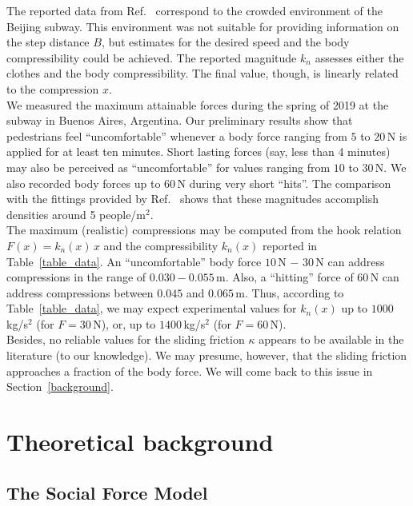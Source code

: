 \documentclass[preprint,12pt]{elsarticle}
\begin{document}
The reported data from Ref.~\cite{song_2019} correspond to the crowded 
environment of the Beijing subway. This environment was not suitable for 
providing information on the step distance $B$, but estimates for the 
desired speed and the body compressibility could be achieved. The reported 
magnitude $k_n$ assesses either the clothes and the body compressibility. The 
final value, though, is linearly related to the compression $x$. \\

We measured the maximum attainable forces during the spring of 2019 at the subway in Buenos Aires, 
Argentina. Our preliminary results show that pedestrians feel ``uncomfortable'' 
whenever a body force ranging from $5$ to $20\,$N is applied for at least ten 
minutes. Short lasting forces (say, less than 4 minutes) may also be perceived 
as ``uncomfortable'' for values ranging from $10$ to $30\,$N. We also recorded body 
forces up to $60\,$N during very short ``hits''. The comparison with the 
fittings provided by Ref.~\cite{song_2019} shows that these magnitudes 
accomplish densities around 5 people/m$^2$.     \\    

The maximum (realistic) compressions may be computed from the hook relation 
$F(x)=k_n(x)\,x$ and the compressibility $k_n(x)$ reported in Table~\ref{table_data}. 
An ``uncomfortable'' body force  $10\,$N $-$ $30\,$N can address compressions in the 
range of $0.030-0.055\,$m. Also, a ``hitting'' force of $60\,$N can address 
compressions between $0.045$ and $0.065\,$m. Thus, according to 
Table~\ref{table_data}, we may expect experimental values for $k_n(x)$ up to 
$1000\,$kg/s$^2$ (for $F=30\,$N), or, up to $1400\,$kg/s$^2$ (for $F=60\,$N). \\

Besides, no reliable values for the sliding friction $\kappa$ appears to be 
available in the literature (to our knowledge). We may presume, however, that 
the sliding friction approaches a fraction of the body force. We will come back 
to this issue in Section~\ref{background}. \\


\section{\label{background}Theoretical background}

\subsection{\label{sfm}The Social Force Model}
\end{document}
